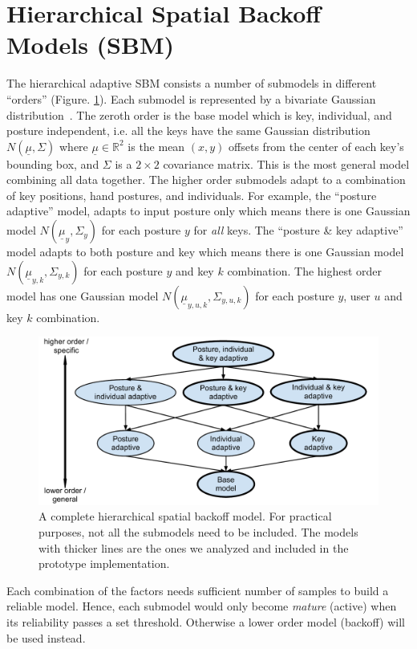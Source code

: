 \documentclass{sigchi}
\begin{document}
\section{Hierarchical Spatial Backoff Models (SBM)}
The hierarchical adaptive SBM consists a number of submodels in different “orders” (Figure. \ref{fig:hierarchy}). Each submodel is represented by a bivariate Gaussian distribution~\cite{Azenkot:2012, Goodman:2002, Rashid:2008}.
The zeroth order is the base model which is key, individual, and posture
independent, i.e. all the keys have the same Gaussian distribution $N(\underline\mu, \Sigma)$
where $\underline\mu \in \mathbb{R}^2$ is the mean $(x, y)$ offsets from the center of
each key's bounding box, and $\Sigma$ is a $2\times 2$ covariance matrix. This is the most general model combining all data together. The
higher order submodels adapt to a combination of 
key positions, hand postures, and individuals. For example, the ``posture adaptive'' model, adapts to input posture only which means there is one Gaussian model $N(\underline\mu_y, \Sigma_y)$ for each posture $y$ for \textit{all} keys. The ``posture \& key adaptive'' model adapts to both posture and key which means there is one Gaussian model $N(\underline\mu_{y, k}, \Sigma_{y, k})$ for each posture $y$ and key $k$ combination.  The highest order model has one Gaussian model $N(\underline\mu_{y,u,k}, \Sigma_{y,u,k})$ for each posture $y$, user $u$ and key $k$ combination.

\begin{figure}[tb]
  \centering
  \includegraphics[width=0.9\columnwidth]{figures/hierarchy.pdf}
  \caption{A complete hierarchical spatial backoff model. For practical purposes, not all the submodels need to be included. The models with thicker lines are the ones we analyzed and included in the prototype implementation.}
  \label{fig:hierarchy}
\end{figure}

Each combination of the factors needs sufficient number of samples to build a reliable model. Hence, each submodel would only become \textit{mature} (active) when its reliability passes a set 
threshold. Otherwise a lower order model (backoff) will be used instead.
\end{document}

